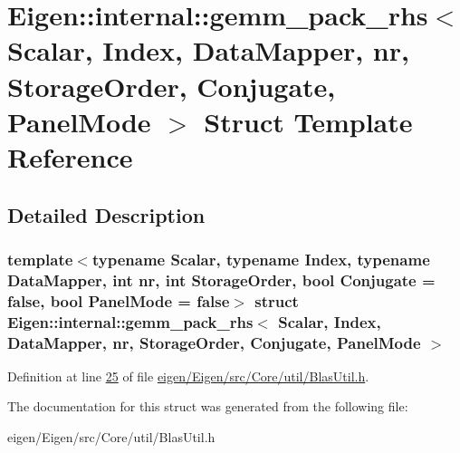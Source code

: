\hypertarget{struct_eigen_1_1internal_1_1gemm__pack__rhs}{}\section{Eigen\+:\+:internal\+:\+:gemm\+\_\+pack\+\_\+rhs$<$ Scalar, Index, Data\+Mapper, nr, Storage\+Order, Conjugate, Panel\+Mode $>$ Struct Template Reference}
\label{struct_eigen_1_1internal_1_1gemm__pack__rhs}


\subsection{Detailed Description}
\subsubsection*{template$<$typename Scalar, typename Index, typename Data\+Mapper, int nr, int Storage\+Order, bool Conjugate = false, bool Panel\+Mode = false$>$\newline
struct Eigen\+::internal\+::gemm\+\_\+pack\+\_\+rhs$<$ Scalar, Index, Data\+Mapper, nr, Storage\+Order, Conjugate, Panel\+Mode $>$}



Definition at line \hyperlink{eigen_2_eigen_2src_2_core_2util_2_blas_util_8h_source_l00025}{25} of file \hyperlink{eigen_2_eigen_2src_2_core_2util_2_blas_util_8h_source}{eigen/\+Eigen/src/\+Core/util/\+Blas\+Util.\+h}.



The documentation for this struct was generated from the following file\+:\begin{DoxyCompactItemize}
\item 
eigen/\+Eigen/src/\+Core/util/\+Blas\+Util.\+h\end{DoxyCompactItemize}
